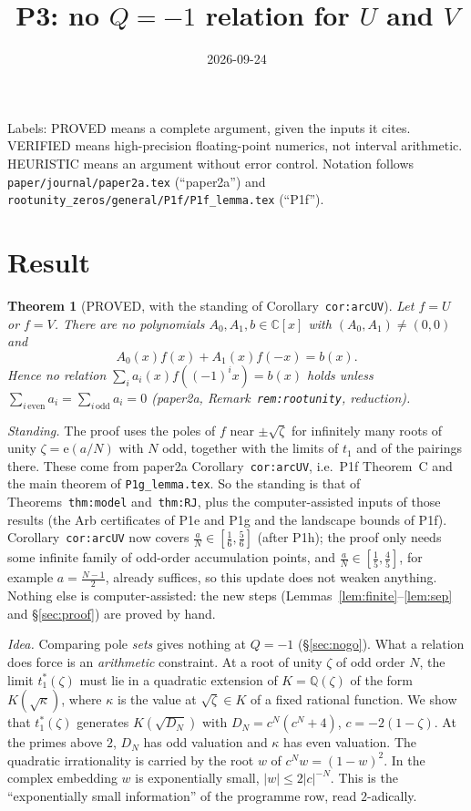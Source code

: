 \documentclass[11pt]{article}
\title{P3: no $Q=-1$ relation for $U$ and $V$}
\date{2026-09-24}
\newtheorem{theorem}{Theorem}
\theoremstyle{remark}
\newcommand{\Q}{\mathbb Q}
\newcommand{\e}{\mathrm e}
\begin{document}
\maketitle

\noindent Labels: PROVED means a complete argument, given the inputs it cites. VERIFIED means high-precision
floating-point numerics, not interval arithmetic. HEURISTIC means an argument without error control.
Notation follows \texttt{paper/journal/paper2a.tex} (``paper2a'') and
\texttt{rootunity\_zeros/general/P1f/P1f\_lemma.tex} (``P1f'').

\section*{Result}

\begin{theorem}[PROVED, with the standing of Corollary~\texttt{cor:arcUV}]\label{thm:main}
Let $f=U$ or $f=V$. There are no polynomials $A_0,A_1,b\in\mathbb C[x]$ with $(A_0,A_1)\neq(0,0)$ and
\[
   A_0(x)f(x)+A_1(x)f(-x)=b(x).
\]
Hence no relation $\sum_ia_i(x)f((-1)^ix)=b(x)$ holds unless $\sum_{i\,\mathrm{even}}a_i=\sum_{i\,\mathrm{odd}}a_i=0$
(paper2a, Remark~\texttt{rem:rootunity}, reduction).
\end{theorem}

\noindent\emph{Standing.} The proof uses the poles of $f$ near $\pm\sqrt\zeta$ for infinitely many roots
of unity $\zeta=\e(a/N)$ with $N$ odd, together with the limits of $t_1$ and of the pairings there.
These come from paper2a Corollary~\texttt{cor:arcUV}, i.e.\ P1f Theorem~C and the main theorem of
\texttt{P1g\_lemma.tex}. So the standing is that of Theorems~\texttt{thm:model} and~\texttt{thm:RJ}, plus
the computer-assisted inputs of those results (the Arb certificates of P1e and P1g and the landscape bounds
of P1f). Corollary~\texttt{cor:arcUV} now covers $\frac aN\in[\frac16,\frac56]$ (after P1h); the proof only
needs some infinite family of odd-order accumulation points, and $\frac aN\in[\frac15,\frac45]$, for example
$a=\frac{N-1}2$, already suffices, so this update does not weaken anything. Nothing else is
computer-assisted: the new steps (Lemmas~\ref{lem:finite}--\ref{lem:sep} and \S\ref{sec:proof}) are proved by hand.

\noindent\emph{Idea.} Comparing pole \emph{sets} gives nothing at $Q=-1$ (\S\ref{sec:nogo}). What a relation
does force is an \emph{arithmetic} constraint. At a root of unity $\zeta$ of odd order $N$, the limit
$t_1^\ast(\zeta)$ must lie in a quadratic extension of $K=\Q(\zeta)$ of the form $K(\sqrt\kappa)$, where
$\kappa$ is the value at $\sqrt\zeta\in K$ of a fixed rational function. We show that
$t_1^\ast(\zeta)$ generates $K(\sqrt{D_N})$ with $D_N=c^N(c^N+4)$, $c=-2(1-\zeta)$. At the primes above $2$,
$D_N$ has odd valuation and $\kappa$ has even valuation. The quadratic irrationality is carried by
the root $w$ of $c^Nw=(1-w)^2$. In the complex embedding $w$ is exponentially small, $|w|\le2|c|^{-N}$.
This is the ``exponentially small information'' of the programme row, read $2$-adically.
\end{document}
